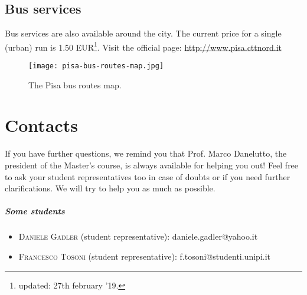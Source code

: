 \documentclass[11pt,fleqn,oneside]{book} %
\begin{document}

\section{Bus services}
Bus services are also available around the city. The current price for a single (urban) run is 1.50 EUR\footnote{updated: 27th february '19.}.
Visit the official page: \url{http://www.pisa.cttnord.it}
\begin{figure}[h]
  \centering\texttt{[image: pisa-bus-routes-map.jpg]}
  \caption{The Pisa bus routes map.}
\end{figure}


\chapter{Contacts}


If you have further questions, we remind you that Prof. Marco Danelutto, the president of the Master’s course, is always available for helping you out! Feel free to ask your student representatives too in case of doubts or if you need further clarifications. We will try to help you as much as possible. 

\paragraph{Some students}
\begin{itemize}
\item \textsc{Daniele Gadler} (student representative): daniele.gadler@yahoo.it
\item \textsc{Francesco Tosoni} (student representative): f.tosoni@studenti.unipi.it
\end{itemize}
\end{document}
